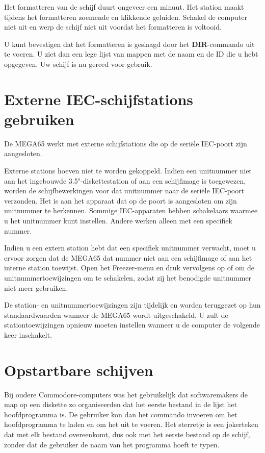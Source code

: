 Het formatteren van de schijf duurt ongeveer een minuut. Het station maakt tijdens het formatteren zoemende en klikkende geluiden. Schakel de computer niet uit en werp de schijf niet uit voordat het formatteren is voltooid.

U kunt bevestigen dat het formatteren is geslaagd door het {\bf DIR}-commando uit te voeren. U ziet dan een lege lijst van mappen met de naam en de ID die u hebt opgegeven. Uw schijf is nu gereed voor gebruik.


\section{Externe IEC-schijfstations gebruiken}

De MEGA65 werkt met externe schijfstations die op de seriële IEC-poort zijn aangesloten.

Externe stations hoeven niet te worden gekoppeld. Indien een unitnummer niet aan het ingebouwde 3.5"-diskettestation of aan een schijfimage is toegewezen, worden de schijfbewerkingen voor dat unitnummer naar de seriële IEC-poort verzonden. Het is aan het apparaat dat op de poort is aangesloten om zijn unitnummer te herkennen. Sommige IEC-apparaten hebben schakelaars waarmee u het unitnummer kunt instellen. Andere werken alleen met een specifiek nummer.

Indien u een extern station hebt dat een specifiek unitnummer verwacht, moet u ervoor zorgen dat de MEGA65 dat nummer niet aan een schijfimage of aan het interne station toewijst. Open het Freezer-menu en druk vervolgens op  of  om de unitnummertoewijzingen om te schakelen, zodat zij het benodigde unitnummer niet meer gebruiken.

De station- en unitnummertoewijzingen zijn tijdelijk en worden teruggezet op hun standaardwaarden wanneer de MEGA65 wordt uitgeschakeld. U zult de stationtoewijzingen opnieuw moeten instellen wanneer u de computer de volgende keer inschakelt.


\section{Opstartbare schijven}

Bij oudere Commodore-computers was het gebruikelijk dat softwaremakers de map op een diskette zo organiseerden dat het eerste bestand in de lijst het hoofdprogramma is. De gebruiker kon dan het commando  invoeren om het hoofdprogramma te laden en  om het uit te voeren. Het sterretje is een jokerteken dat met elk bestand overeenkomt, dus ook met het eerste bestand op de schijf, zonder dat de gebruiker de naam van het programma hoeft te typen.

